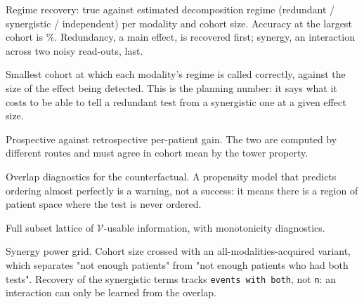 \documentclass[11pt]{article}
\newcommand{\fittable}[1]{%
  \resizebox{\ifdim\width>\linewidth\linewidth\else\width\fi}{!}{#1}}
\theoremstyle{definition}
\theoremstyle{remark}
\newcommand{\Vc}{\mathcal{V}}
\begin{document}
\begin{table}[htbp]\centering\small
\caption{Regime recovery: true against estimated decomposition regime
(redundant / synergistic / independent) per modality and cohort size. Accuracy
at the largest cohort is \simRegimeAccuracy\%. Redundancy, a main effect, is
recovered first; synergy, an interaction across two noisy read-outs, last.}
\label{tab:s-regime}
\fittable{}
\end{table}

\begin{table}[htbp]\centering\small
\caption{Smallest cohort at which each modality's regime is called correctly,
against the size of the effect being detected. This is the planning number: it
says what it costs to be able to tell a redundant test from a synergistic one at
a given effect size.}
\label{tab:s-firstcorrect}
\fittable{}
\end{table}

\begin{table}[htbp]\centering\small
\caption{Prospective against retrospective per-patient gain. The two are
computed by different routes and must agree in cohort mean by the tower
property.}
\label{tab:s-consistency}
\fittable{}
\end{table}

\begin{table}[htbp]\centering\small
\caption{Overlap diagnostics for the counterfactual. A propensity model that
predicts ordering almost perfectly is a warning, not a success: it means there
is a region of patient space where the test is never ordered.}
\label{tab:s-overlap}
\fittable{}
\end{table}

\begin{table}[htbp]\centering\small
\caption{Full subset lattice of $\Vc$-usable information, with monotonicity
diagnostics.}
\label{tab:s-lattice}
\fittable{}
\end{table}

\begin{table}[htbp]\centering\small
\caption{Synergy power grid. Cohort size crossed with an all-modalities-acquired
variant, which separates "not enough patients" from "not enough patients who had
both tests". Recovery of the synergistic terms tracks \texttt{events with both},
not \texttt{n}: an interaction can only be learned from the overlap.}
\label{tab:s-power}
\fittable{}
\end{table}
\end{document}
